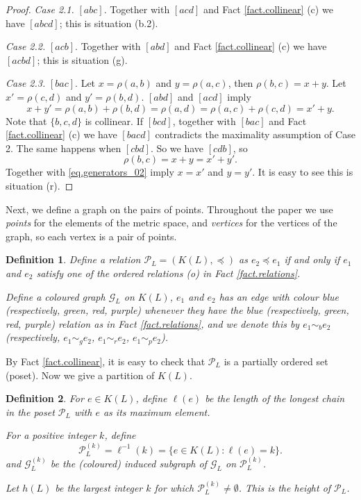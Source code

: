 \documentclass[12pt]{article}
\newtheorem{defi}{Definition}
\begin{document}
\begin{proof}
{\em Case 2.1.} $[abc]$. Together with $[acd]$ and Fact \ref{fact.collinear} (c)
we have $[abcd]$; this is situation (b.2).

{\em Case 2.2.} $[acb]$. Together with $[abd]$ and Fact \ref{fact.collinear} (c)
we have $[acbd]$; this is situation (g).

{\em Case 2.3.} $[bac]$. Let $x = \rho(a,b)$ and $y = \rho(a, c)$, 
then $\rho(b, c) = x+y$. Let $x' = \rho(c, d)$ and $y' = \rho(b, d)$.
$[abd]$ and $[acd]$ imply
\begin{equation}\label{eq.generators_02}
x+y' = \rho(a, b) + \rho(b, d) = \rho(a, d) = \rho(a, c) + \rho(c, d) = x'+y.
\end{equation}
Note that $\{b, c, d\}$ is collinear. If $[bcd]$, together with $[bac]$
and Fact \ref{fact.collinear} (c) we have $[bacd]$ contradicts the
maximality assumption of Case 2. The same happens when $[cbd]$.
So we have $[cdb]$, so
\[
\rho(b, c) = x+y = x'+y'.
\]
Together with \eqref{eq.generators_02} imply
$x=x'$ and $y=y'$. It is easy to see this is situation (r).
\end{proof}

Next, we define a graph on the pairs of points.
Throughout the paper we use {\em points} for the elements
of the metric space, and {\em vertices} for the vertices of
the graph, so each vertex is a pair of points.

\begin{defi}
Define a relation $\mathcal{P}_L = (K(L), \preccurlyeq)$
as $e_2 \preccurlyeq e_1$ if and only if
$e_1$ and $e_2$ satisfy one of the ordered relations
(o) in Fact \ref{fact.relations}.

Define a coloured graph $\mathcal{G}_L$ on $K(L)$,
$e_1$ and $e_2$ has an edge with colour
blue (respectively, green, red, purple)
whenever they have the blue (respectively, green, red, purple)
relation as in Fact \ref{fact.relations},
and we denote this by $e_1 \sim_b e_2$
(respectively, $e_1 \sim_g e_2$, $e_1 \sim_r e_2$, $e_1 \sim_p e_2$).
\end{defi}

By Fact \ref{fact.collinear}, it is easy to check that
$\mathcal{P}_L$ is a partially ordered set (poset).
Now we give a partition of $K(L)$.

\begin{defi}
For $e \in K(L)$, define $\ell(e)$
be the length of the longest chain in the poset $\mathcal{P}_L$
with $e$ as its maximum element.

For a positive integer $k$, define 
\[
\mathcal{P}_L^{(k)} = \ell^{-1}(k) = \{e \in K(L): \ell(e) = k\}.
\]
and $\mathcal{G}_L^{(k)}$ be the (coloured) induced subgraph
of $\mathcal{G}_L$ on $\mathcal{P}_L^{(k)}$.

Let $h(L)$ be the largest integer $k$
for which $\mathcal{P}_L^{(k)} \neq \emptyset$.
This is the {\em height} of $\mathcal{P}_L$.
\end{defi}
\end{document}
